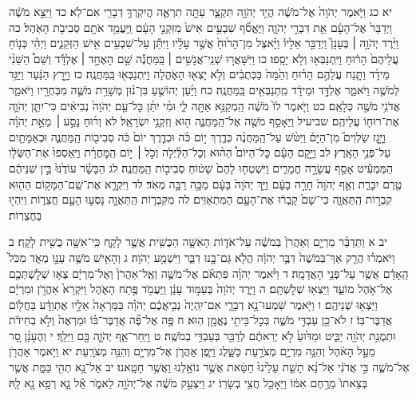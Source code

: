 \documentclass[twoside, openany, parskip=half, 11pt]{book}
\begin{document}
יא כג וַיֹּ֤אמֶר יְהֹוָה֙ אֶל־מֹשֶׁ֔ה הֲיַ֥ד יְהֹוָ֖ה תִּקְצָ֑ר עַתָּ֥ה תִרְאֶ֛ה הֲיִקְרְךָ֥ דְבָרִ֖י אִם־לֹֽא׃ כד וַיֵּצֵ֣א מֹשֶׁ֔ה וַיְדַבֵּר֙ אֶל־הָעָ֔ם אֵ֖ת דִּבְרֵ֣י יְהֹוָ֑ה וַיֶּאֱסֹ֞ף שִׁבְעִ֥ים אִישׁ֙ מִזִּקְנֵ֣י הָעָ֔ם וַֽיַּעֲמֵ֥ד אֹתָ֖ם סְבִיבֹ֥ת הָאֹֽהֶל׃ כה וַיֵּ֨רֶד יְהֹוָ֥ה ׀ בֶּעָנָן֮ וַיְדַבֵּ֣ר אֵלָיו֒ וַיָּ֗אצֶל מִן־הָר֙וּחַ֙ אֲשֶׁ֣ר עָלָ֔יו וַיִּתֵּ֕ן עַל־שִׁבְעִ֥ים אִ֖ישׁ הַזְּקֵנִ֑ים וַיְהִ֗י כְּנ֤וֹחַ עֲלֵיהֶם֙ הָר֔וּחַ וַיִּֽתְנַבְּא֖וּ וְלֹ֥א יָסָֽפוּ׃ כו וַיִּשָּׁאֲר֣וּ שְׁנֵֽי־אֲנָשִׁ֣ים ׀ בַּֽמַּחֲנֶ֡ה שֵׁ֣ם הָאֶחָ֣ד ׀ אֶלְדָּ֡ד וְשֵׁם֩ הַשֵּׁנִ֨י מֵידָ֜ד וַתָּ֧נַח עֲלֵהֶ֣ם הָר֗וּחַ וְהֵ֙מָּה֙ בַּכְּתֻבִ֔ים וְלֹ֥א יָצְא֖וּ הָאֹ֑הֱלָה וַיִּֽתְנַבְּא֖וּ בַּֽמַּחֲנֶֽה׃ כז וַיָּ֣רׇץ הַנַּ֔עַר וַיַּגֵּ֥ד לְמֹשֶׁ֖ה וַיֹּאמַ֑ר אֶלְדָּ֣ד וּמֵידָ֔ד מִֽתְנַבְּאִ֖ים בַּֽמַּחֲנֶֽה׃ כח וַיַּ֜עַן יְהוֹשֻׁ֣עַ בִּן־נ֗וּן מְשָׁרֵ֥ת מֹשֶׁ֛ה מִבְּחֻרָ֖יו וַיֹּאמַ֑ר אֲדֹנִ֥י מֹשֶׁ֖ה כְּלָאֵֽם׃ כט וַיֹּ֤אמֶר לוֹ֙ מֹשֶׁ֔ה הַֽמְקַנֵּ֥א אַתָּ֖ה לִ֑י וּמִ֨י יִתֵּ֜ן כׇּל־עַ֤ם יְהֹוָה֙ נְבִיאִ֔ים כִּי־יִתֵּ֧ן יְהֹוָ֛ה אֶת־רוּח֖וֹ עֲלֵיהֶֽם׃ שביעיל וַיֵּאָסֵ֥ף מֹשֶׁ֖ה אֶל־הַֽמַּחֲנֶ֑ה ה֖וּא וְזִקְנֵ֥י יִשְׂרָאֵֽל׃ לא וְר֜וּחַ נָסַ֣ע ׀ מֵאֵ֣ת יְהֹוָ֗ה וַיָּ֣גׇז שַׂלְוִים֮ מִן־הַיָּם֒ וַיִּטֹּ֨שׁ עַל־הַֽמַּחֲנֶ֜ה כְּדֶ֧רֶךְ י֣וֹם כֹּ֗ה וּכְדֶ֤רֶךְ יוֹם֙ כֹּ֔ה סְבִיב֖וֹת הַֽמַּחֲנֶ֑ה וּכְאַמָּתַ֖יִם עַל־פְּנֵ֥י הָאָֽרֶץ׃ לב וַיָּ֣קׇם הָעָ֡ם כׇּל־הַיּוֹם֩ הַה֨וּא וְכׇל־הַלַּ֜יְלָה וְכֹ֣ל ׀ י֣וֹם הַֽמׇּחֳרָ֗ת וַיַּֽאַסְפוּ֙ אֶת־הַשְּׂלָ֔ו הַמַּמְעִ֕יט אָסַ֖ף עֲשָׂרָ֣ה חֳמָרִ֑ים וַיִּשְׁטְח֤וּ לָהֶם֙ שָׁט֔וֹחַ סְבִיב֖וֹת הַֽמַּחֲנֶֽה׃ לג הַבָּשָׂ֗ר עוֹדֶ֙נּוּ֙ בֵּ֣ין שִׁנֵּיהֶ֔ם טֶ֖רֶם יִכָּרֵ֑ת וְאַ֤ף יְהֹוָה֙ חָרָ֣ה בָעָ֔ם וַיַּ֤ךְ יְהֹוָה֙ בָּעָ֔ם מַכָּ֖ה רַבָּ֥ה מְאֹֽד׃ לד וַיִּקְרָ֛א אֶת־שֵֽׁם־הַמָּק֥וֹם הַה֖וּא קִבְר֣וֹת הַֽתַּאֲוָ֑ה כִּי־שָׁם֙ קָֽבְר֔וּ אֶת־הָעָ֖ם הַמִּתְאַוִּֽים׃ לה מִקִּבְר֧וֹת הַֽתַּאֲוָ֛ה נָסְע֥וּ הָעָ֖ם חֲצֵר֑וֹת וַיִּהְי֖וּ בַּחֲצֵרֽוֹת׃

יב א וַתְּדַבֵּ֨ר מִרְיָ֤ם וְאַהֲרֹן֙ בְּמֹשֶׁ֔ה עַל־אֹד֛וֹת הָאִשָּׁ֥ה הַכֻּשִׁ֖ית אֲשֶׁ֣ר לָקָ֑ח כִּֽי־אִשָּׁ֥ה כֻשִׁ֖ית לָקָֽח׃ ב וַיֹּאמְר֗וּ הֲרַ֤ק אַךְ־בְּמֹשֶׁה֙ דִּבֶּ֣ר יְהֹוָ֔ה הֲלֹ֖א גַּם־בָּ֣נוּ דִבֵּ֑ר וַיִּשְׁמַ֖ע יְהֹוָה׃ ג וְהָאִ֥ישׁ מֹשֶׁ֖ה עָנָ֣ו מְאֹ֑ד מִכֹּל֙ הָֽאָדָ֔ם אֲשֶׁ֖ר עַל־פְּנֵ֥י הָאֲדָמָֽה׃
ד וַיֹּ֨אמֶר יְהֹוָ֜ה פִּתְאֹ֗ם אֶל־מֹשֶׁ֤ה וְאֶֽל־אַהֲרֹן֙ וְאֶל־מִרְיָ֔ם צְא֥וּ שְׁלׇשְׁתְּכֶ֖ם אֶל־אֹ֣הֶל מוֹעֵ֑ד וַיֵּצְא֖וּ שְׁלׇשְׁתָּֽם׃ ה וַיֵּ֤רֶד יְהֹוָה֙ בְּעַמּ֣וּד עָנָ֔ן וַֽיַּעֲמֹ֖ד פֶּ֣תַח הָאֹ֑הֶל וַיִּקְרָא֙ אַהֲרֹ֣ן וּמִרְיָ֔ם וַיֵּצְא֖וּ שְׁנֵיהֶֽם׃ ו וַיֹּ֖אמֶר שִׁמְעוּ־נָ֣א דְבָרָ֑י אִם־יִֽהְיֶה֙ נְבִ֣יאֲכֶ֔ם יְהֹוָ֗ה בַּמַּרְאָה֙ אֵלָ֣יו אֶתְוַדָּ֔ע בַּחֲל֖וֹם אֲדַבֶּר־בּֽוֹ׃ ז לֹא־כֵ֖ן עַבְדִּ֣י מֹשֶׁ֑ה בְּכׇל־בֵּיתִ֖י נֶאֱמָ֥ן הֽוּא׃ ח פֶּ֣ה אֶל־פֶּ֞ה אֲדַבֶּר־בּ֗וֹ וּמַרְאֶה֙ וְלֹ֣א בְחִידֹ֔ת וּתְמֻנַ֥ת יְהֹוָ֖ה יַבִּ֑יט וּמַדּ֙וּעַ֙ לֹ֣א יְרֵאתֶ֔ם לְדַבֵּ֖ר בְּעַבְדִּ֥י בְמֹשֶֽׁה׃ ט וַיִּֽחַר־אַ֧ף יְהֹוָ֛ה בָּ֖ם וַיֵּלַֽךְ׃ י וְהֶעָנָ֗ן סָ֚ר מֵעַ֣ל הָאֹ֔הֶל וְהִנֵּ֥ה מִרְיָ֖ם מְצֹרַ֣עַת כַּשָּׁ֑לֶג וַיִּ֧פֶן אַהֲרֹ֛ן אֶל־מִרְיָ֖ם וְהִנֵּ֥ה מְצֹרָֽעַת׃ יא וַיֹּ֥אמֶר אַהֲרֹ֖ן אֶל־מֹשֶׁ֑ה בִּ֣י אֲדֹנִ֔י אַל־נָ֨א תָשֵׁ֤ת עָלֵ֙ינוּ֙ חַטָּ֔את אֲשֶׁ֥ר נוֹאַ֖לְנוּ וַאֲשֶׁ֥ר חָטָֽאנוּ׃ יב אַל־נָ֥א תְהִ֖י כַּמֵּ֑ת אֲשֶׁ֤ר בְּצֵאתוֹ֙ מֵרֶ֣חֶם אִמּ֔וֹ וַיֵּאָכֵ֖ל חֲצִ֥י בְשָׂרֽוֹ׃ יג וַיִּצְעַ֣ק מֹשֶׁ֔ה אֶל־יְהֹוָ֖ה לֵאמֹ֑ר אֵ֕ל נָ֛א רְפָ֥א נָ֖א לָֽהּ׃
\end{document}

